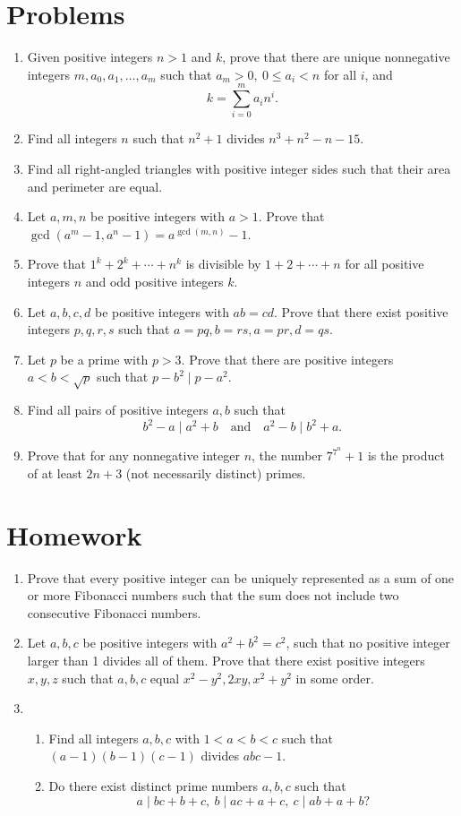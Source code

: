\documentclass{article}
\begin{document}
\section{Problems}
  \begin{enumerate}
    \item Given positive integers $n>1$ and $k$, prove that there are unique
      nonnegative integers $m,a_0,a_1,\ldots,a_m$ such that $a_m>0,\ 0\le
      a_i<n$ for all $i$, and
      \[k=\sum_{i=0}^m a_i n^i.\]
    \item Find all integers $n$ such that $n^2+1$ divides $n^3+n^2-n-15$.
    \item Find all right-angled triangles with positive integer sides 
      such that their area and perimeter are equal.
    \item Let $a,m,n$ be positive integers with $a>1$.
      Prove that $\gcd(a^m-1,a^n-1)=a^{\gcd(m,n)}-1$.
    \item Prove that $1^k+2^k+\cdots+n^k$ is divisible by $1+2+\cdots+n$ for
      all positive integers $n$ and odd positive integers $k$.
    \item Let $a,b,c,d$ be positive integers with $ab=cd$. Prove that there
      exist positive integers $p,q,r,s$ such that \(a=pq,b=rs,a=pr,d=qs\).
    \item Let $p$ be a prime with $p>3$. Prove that there are positive integers
      $a<b<\sqrt p$ such that $p-b^2\mid p-a^2$.
    \item Find all pairs of positive integers $a,b$ such that \[b^2-a\mid
        a^2+b\quad\text{and}\quad a^2-b\mid b^2+a.\]
    \item Prove that for any nonnegative integer $n$, the number $7^{7^n}+1$ is
      the product of at least $2n+3$ (not necessarily distinct) primes.
  \end{enumerate}
\newpage
\section{Homework}
  \begin{enumerate}
    \item Prove that every positive integer can be uniquely represented as a sum
      of one or more Fibonacci numbers such that the sum does not include two
      consecutive Fibonacci numbers.
    \item Let $a, b, c$ be positive integers with $a^2+b^2=c^2$, such that no
      positive integer larger than 1 divides all of them. Prove that
      there exist positive integers $x,y,z$ such that $a,b,c$ equal
      $x^2-y^2,2xy,x^2+y^2$ in some order.
    \item
      \begin{enumerate}
        \item Find all integers $a,b,c$ with $1<a<b<c$ such that $(a-1)(b-1)(c-1)$
          divides $abc-1$.
        \item Do there exist distinct prime numbers $a,b,c$ such that
          \[a\mid bc+b+c,\ b\mid ac+a+c,\ c\mid ab+a+b?\]
      \end{enumerate}
  \end{enumerate}
\end{document}
